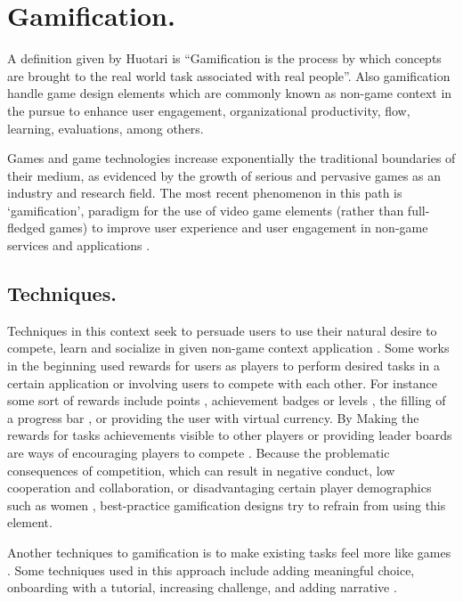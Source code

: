 \section{Gamification.}

A definition given by Huotari  \cite{huotari2012defining} is  “Gamification is
the process by which concepts are brought to the real world task associated with
real people”. Also gamification handle game design elements which are commonly
known as non-game context in the pursue to  enhance user engagement,
organizational productivity, flow, learning, evaluations, among others.

Games and game technologies increase exponentially the traditional boundaries of
their medium, as evidenced by the growth of serious and pervasive games as an
industry and research field. The most recent phenomenon in this path is
‘gamification’, paradigm for the use of video game elements (rather than full-
fledged games) to improve user experience and user engagement in non-game
services and applications \cite{deterding2011gamification}.

\subsection{Techniques.}


Techniques in this context seek to persuade users to use their natural desire to
compete, learn and socialize in given non-game context application
\cite{deterding2011game}\cite{hamari2014does}. Some works in the beginning used
rewards for users as players to perform desired tasks in a certain application
or involving users to compete with each other. For instance some sort of
rewards include points \cite{sutter2010browse}, achievement badges or levels
\cite{hamari2011framework}, the filling of a progress bar \cite{o2010get}, or
providing the user with virtual currency. By Making the rewards for  tasks
achievements visible to other players or providing leader boards are ways of
encouraging players to compete \cite{hickman2010total}. Because the  problematic
consequences of competition, which can result in negative conduct, low
cooperation and collaboration, or disadvantaging certain player demographics
such as women \cite{kumar2013gamification}, best-practice gamification designs
try to refrain from using this element.

Another techniques to gamification is to make existing tasks feel more like
games \cite{deterding2010just}. Some techniques used in this approach include
adding meaningful choice, onboarding with a tutorial, increasing challenge, and
adding narrative \cite{mcgonigal2011reality}.
